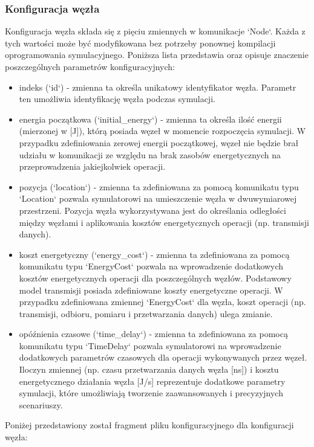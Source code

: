 \documentclass[a4paper,12pt,twoside,openany]{report}
\begin{document}
\subsubsection{Konfiguracja węzła}

Konfiguracja węzła składa się z pięciu zmiennych w komunikacje `Node`. Każda z tych wartości może być modyfikowana bez potrzeby
ponownej kompilacji oprogramowania symulacyjnego. Poniższa lista przedstawia oraz opisuje znaczenie poszczególnych parametrów konfiguracyjnych:

\begin{itemize}
 \item indeks (`id`) - zmienna ta określa unikatowy identyfikator węzła. Parametr ten umożliwia identyfikację węzła podczas symulacji.
 \item energia początkowa (`initial\_energy`) - zmienna ta określa ilość energii (mierzonej w [J]), którą posiada węzeł w momencie rozpoczęcia symulacji.
       W przypadku zdefiniowania zerowej energii początkowej, węzeł nie będzie brał udziału w komunikacji ze względu na brak zasobów energetycznych na
       przeprowadzenia jakiejkolwiek operacji.
 \item pozycja (`location`) - zmienna ta zdefiniowana za pomocą komunikatu typu `Location` pozwala symulatorowi na umieszczenie węzła w dwuwymiarowej przestrzeni.
       Pozycja węzła wykorzystywana jest do określania odległości między węzłami i aplikowania kosztów energetycznych operacji (np. transmisji danych).
 \item koszt energetyczny (`energy\_cost`) - zmienna ta zdefiniowana za pomocą komunikatu typu `EnergyCost` pozwala na wprowadzenie dodatkowych kosztów energetycznych
       operacji dla poszczególnych węzłów. Podstawowy model transmisji posiada zdefiniowane koszty energetyczne operacji.
       W przypadku zdefiniowana zmiennej `EnergyCost` dla węzła, koszt operacji (np. transmisji, odbioru, pomiaru i przetwarzania danych) ulega zmianie.
 \item opóźnienia czasowe (`time\_delay`) - zmienna ta zdefiniowana za pomocą komunikatu typu `TimeDelay` pozwala symulatorowi na wprowadzenie dodatkowych parametrów czasowych
       dla operacji wykonywanych przez węzeł. Iloczyn zmiennej (np. czasu przetwarzania danych węzła [ns]) i kosztu energetycznego działania węzła [J/s] 
       reprezentuje dodatkowe parametry symulacji, które umożliwiają tworzenie zaawansowanych i precyzyjnych scenariuszy.
\end{itemize}

Poniżej przedstawiony został fragment pliku konfiguracyjnego dla konfiguracji węzła:
\end{document}
